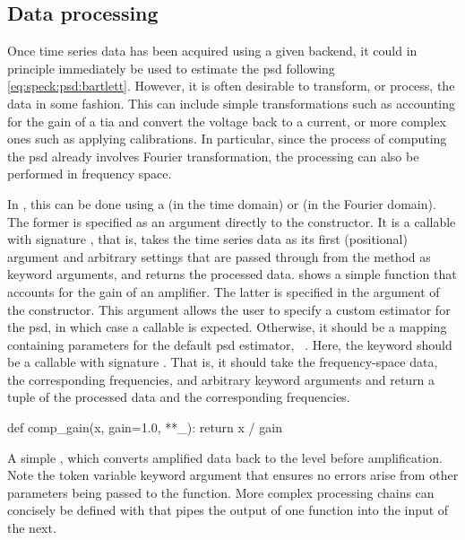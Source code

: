 \subsection{Data processing}\label{subsec:speck:software:design:processing}
Once time series data has been acquired using a given  backend, it could in principle immediately be used to estimate the \gls{psd} following \cref{eq:speck:psd:bartlett}.
However, it is often desirable to transform, or process, the data in some fashion.
This can include simple transformations such as accounting for the gain of a \gls{tia} and convert the voltage back to a current,
or more complex ones such as applying calibrations.
In particular, since the process of computing the \gls{psd} already involves Fourier transformation, the processing can also be performed in frequency space.

In \pyspeck, this can be done using a  (in the time domain) or  (in the Fourier domain).
The former is specified as an argument directly to the  constructor.
It is a callable with signature , that is, takes the time series data as its first (positional) argument and arbitrary settings that are passed through from the  method as keyword arguments, and returns the processed data.
 shows a simple function that accounts for the gain of an amplifier.
The latter is specified in the  argument of the  constructor.
This argument allows the user to specify a custom estimator for the \gls{psd}, in which case a callable is expected.
Otherwise, it should be a mapping containing parameters for the default \gls{psd} estimator, ~.
Here, the keyword  should be a callable with signature .
That is, it should take the frequency-space data, the corresponding frequencies, and arbitrary keyword arguments and return a tuple of the processed data and the corresponding frequencies.

\begin{marginlisting}[*2]
    \begin{py}[fontsize=\footnotesize]
        def comp_gain(x, gain=1.0, **_):
            return x / gain
    \end{py}
    \caption[Simple  example]{
        A simple , which converts amplified data back to the level before amplification.
        Note the token \code{**_} variable keyword argument that ensures no errors arise from other parameters being passed to the function.
        More complex processing chains can concisely be defined with  that pipes the output of one function into the input of the next.
    }
    \label{lst:speck:procfn}
\end{marginlisting}

